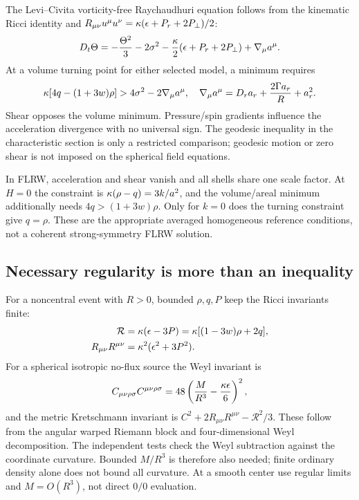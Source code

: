 The Levi--Civita vorticity-free Raychaudhuri equation follows from the kinematic Ricci identity and $R_{\mu\nu}u^\mu u^\nu=\kappa(\epsilon+P_r+2P_\perp)/2$:
\begin{equation}
 D_t\Theta=-\frac{\Theta^2}{3}-2\sigma^2-\frac{\kappa}2(\epsilon+P_r+2P_\perp)
 +\nabla_\mu a^\mu.
\end{equation}
At a volume turning point for either selected model, a minimum requires
\begin{equation}\label{eq:volumebounce}
 \kappa[4q-(1+3w)\rho]>4\sigma^2-2\nabla_\mu a^\mu,\quad
 \nabla_\mu a^\mu=D_r a_r+\frac{2\Gamma a_r}{R}+a_r^2.
\end{equation}
Shear opposes the volume minimum. Pressure/spin gradients influence the acceleration divergence with no universal sign. The geodesic inequality in the characteristic section is only a restricted comparison; geodesic motion or zero shear is not imposed on the spherical field equations.

In FLRW, acceleration and shear vanish and all shells share one scale factor. At $H=0$ the constraint is $\kappa(\rho-q)=3k/a^2$, and the volume/areal minimum additionally needs $4q>(1+3w)\rho$. Only for $k=0$ does the turning constraint give $q=\rho$. These are the appropriate averaged homogeneous reference conditions, not a coherent strong-symmetry FLRW solution.

\subsection{Necessary regularity is more than an inequality}
For a noncentral event with $R>0$, bounded $\rho,q,P$ keep the Ricci invariants finite:
\begin{align}
 \mathcal R&=\kappa(\epsilon-3P)=\kappa[(1-3w)\rho+2q],\\
 R_{\mu\nu}R^{\mu\nu}&=\kappa^2(\epsilon^2+3P^2).
\end{align}
For a spherical isotropic no-flux source the Weyl invariant is
\begin{equation}
 C_{\mu\nu\rho\sigma}C^{\mu\nu\rho\sigma}
 =48\left(\frac{M}{R^3}-\frac{\kappa\epsilon}{6}\right)^2,
\end{equation}
and the metric Kretschmann invariant is $C^2+2R_{\mu\nu}R^{\mu\nu}-\mathcal R^2/3$. These follow from the angular warped Riemann block and four-dimensional Weyl decomposition. The independent tests check the Weyl subtraction against the coordinate curvature. Bounded $M/R^3$ is therefore also needed; finite ordinary density alone does not bound all curvature. At a smooth center use regular limits and $M=O(R^3)$, not direct $0/0$ evaluation.

